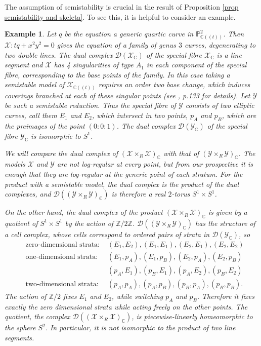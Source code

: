 \documentclass{amsart}%
\numberwithin{equation}{subsection}
\theoremstyle{plain2}
\theoremstyle{definition2}
\newtheorem{example}[equation]{Example}
\theoremstyle{stepstyle}
\theoremstyle{point}
\theoremstyle{subpoint}
\newcommand{\D}{{\mathcal D}}
\newcommand{\Z}{\ensuremath{\mathbb{Z}}}
\newcommand{\C}{\ensuremath{\mathbb{C}}}
\newcommand{\cX}{\ensuremath{\mathscr{X}}}
\newcommand{\cY}{\ensuremath{\mathscr{Y}}}
\renewcommand{\C}{\ensuremath{\mathbb{C}}}
\renewcommand{\cY}{\ensuremath{\mathscr{Y}}}
\begin{document}
The assumption of semistability is crucial in the result of Proposition \ref{prop semistability and skeleta}. To see this, it is helpful to consider an example.
\begin{example}\label{quartic} Let $q$ be the equation a generic quartic curve in $\mathbb{P}^2_{\C((t))}$. Then $\cX:t q+x^2y^2=0$ gives the equation of a family of genus $3$ curves, degenerating to two double lines. The dual complex $\D(\cX_\C)$ of the special fibre $\cX_\C$ is a line segment and $\cX$ has 4 singularities of type $A_1$ in each component of the special fibre, corresponding to the base points of the family. In this case taking a semistable model of $\cX_{\C((t))}$ requires an order two base change, which induces coverings branched at each of these singular points (see \cite{HarrisMorrison}, p.133 for details). Let $\cY$ be such a semistable reduction. Thus the special fibre of $\cY$ consists of two elliptic curves, call them $E_1$ and $E_2$, which intersect in two points, $p_A$ and $p_B$, which are the preimages of the point $(0:0:1)$. The dual complex $\D(\cY_\C)$ of the special fibre $\cY_\C$ is isomorphic to $S^1$.

We will compare the dual complex of $(\cX \times_{R} \cX)_\C$ with that of $(\cY\times_{R} \cY)_\C$. The models $\cX$ and $\cY$ are not log-regular at every point, but from our prospective it is enough that they are log-regular at the generic point of each stratum. For the product with a  semistable model, the dual complex is the product of the dual complexes, and $\D((\cY\times_{R} \cY)_\C)$ is therefore a real $2$-torus  $S^1 \times S^1$.

On the other hand, the dual complex of the product $(\cX \times_{R} \cX)_\C$ is given by a quotient of $S^1 \times S^1$ by the action of $\mathbb{Z}/2\Z$.  $\D((\cY \times_R \cY)_\C)$ has the structure of a cell complex, whose cells correspond to ordered pairs of strata in  $\D(\cY_\C)$, so
\begin{align*}
&\text{zero-dimensional strata: }&(E_1, E_2), (E_1, E_1), (E_2, E_1), (E_2, E_2)\\
&\text{one-dimensional strata: }&(E_1, p_A), (E_1, p_B), (E_2, p_A), (E_2, p_B)\\
& &(p_A, E_1), (p_B, E_1), (p_A, E_2), (p_B, E_2)\\
&\text{two-dimensional strata: }& (p_A, p_A), (p_A, p_B), (p_B, p_A), (p_B, p_B).\end{align*}
The action of $\mathbb{Z}/2$ fixes $E_1$ and $E_2$, while switching $p_A$ and $p_B$. Therefore it fixes exactly the zero dimensional strata while acting freely on the other points. The quotient, the complex $\D((\cX\times_{R}\cX)_\C)$, is piecewise-linearly homeomorphic to the sphere $S^2$. In particular, it is not isomorphic to the product of two line segments.
\end{example}
\end{document}
